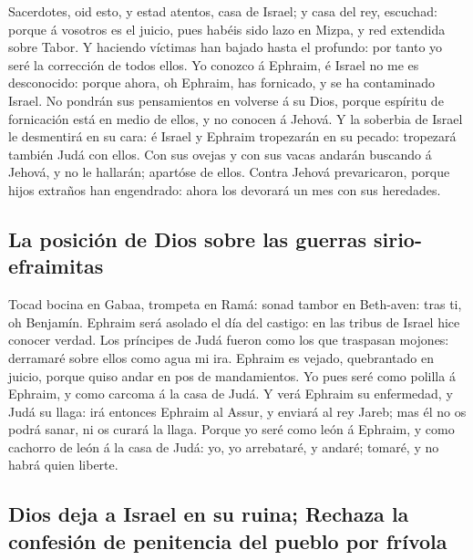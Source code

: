  Sacerdotes, oid esto, y estad atentos, casa de Israel; y
casa del rey, escuchad: porque á vosotros es el juicio, pues habéis sido
lazo en Mizpa, y red extendida sobre Tabor.  Y haciendo
víctimas han bajado hasta el profundo: por tanto yo seré la corrección
de todos ellos.  Yo conozco á Ephraim, é Israel no me es
desconocido: porque ahora, oh Ephraim, has fornicado, y se ha
contaminado Israel.  No pondrán sus pensamientos en volverse
á su Dios, porque espíritu de fornicación está en medio de ellos, y no
conocen á Jehová.  Y la soberbia de Israel le desmentirá en
su cara: é Israel y Ephraim tropezarán en su pecado: tropezará también
Judá con ellos.  Con sus ovejas y con sus vacas andarán
buscando á Jehová, y no le hallarán; apartóse de ellos. 
Contra Jehová prevaricaron, porque hijos extraños han engendrado: ahora
los devorará un mes con sus heredades.

\hypertarget{la-posiciuxf3n-de-dios-sobre-las-guerras-sirio-efraimitas}{%
\subsection{La posición de Dios sobre las guerras
sirio-efraimitas}\label{la-posiciuxf3n-de-dios-sobre-las-guerras-sirio-efraimitas}}

 Tocad bocina en Gabaa, trompeta en Ramá: sonad tambor en
Beth-aven: tras ti, oh Benjamín.  Ephraim será asolado el
día del castigo: en las tribus de Israel hice conocer verdad.
 Los príncipes de Judá fueron como los que traspasan
mojones: derramaré sobre ellos como agua mi ira.  Ephraim
es vejado, quebrantado en juicio, porque quiso andar en pos de
mandamientos.  Yo pues seré como polilla á Ephraim, y como
carcoma á la casa de Judá.  Y verá Ephraim su enfermedad, y
Judá su llaga: irá entonces Ephraim al Assur, y enviará al rey Jareb;
mas él no os podrá sanar, ni os curará la llaga.  Porque yo
seré como león á Ephraim, y como cachorro de león á la casa de Judá: yo,
yo arrebataré, y andaré; tomaré, y no habrá quien liberte.

\hypertarget{dios-deja-a-israel-en-su-ruina-rechaza-la-confesiuxf3n-de-penitencia-del-pueblo-por-fruxedvola}{%
\subsection{Dios deja a Israel en su ruina; Rechaza la confesión de
penitencia del pueblo por
frívola}\label{dios-deja-a-israel-en-su-ruina-rechaza-la-confesiuxf3n-de-penitencia-del-pueblo-por-fruxedvola}}

